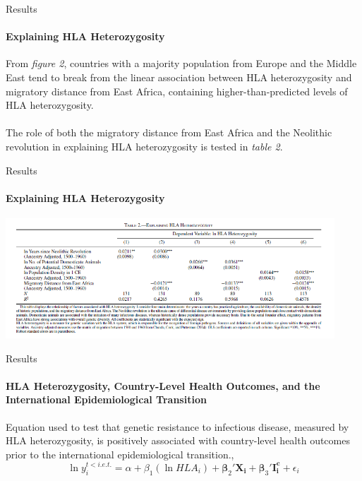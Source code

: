 \documentclass[pdftex,12pt,xcolor=pdftex,table]{beamer}
\theoremstyle{definition}
\theoremstyle{remark}
\numberwithin{equation}{section}
\numberwithin{figure}{section}
\begin{document}
\begin{frame}{Results}
\framesubtitle{Explaining HLA Heterozygosity}
\justifying
From \textit{figure 2}, countries with a majority population from Europe and the Middle East tend to break from the linear association between HLA heterozygosity and migratory distance from East Africa, containing higher-than-predicted levels of HLA heterozygosity.\\~\\
The role of both the migratory distance from East Africa and the Neolithic revolution in explaining HLA heterozygosity is tested in \textit{table 2}.
\end{frame}

\begin{frame}{Results}
\framesubtitle{Explaining HLA Heterozygosity}
\justifying
\includegraphics[height=4.5cm]{Table_2.PNG}
\end{frame}


\begin{frame}{Results}
\framesubtitle{HLA Heterozygosity, Country-Level Health Outcomes, and the International Epidemiological Transition}
\justifying
Equation used to test that genetic resistance to infectious disease, measured by HLA heterozygosity, is positively associated with country-level health outcomes prior to the international epidemiological transition.,
\pause
\begin{equation}
    \ln y_{i}^{t<i.e.t.}=\alpha+\beta_{1}(\ln HLA_{i})+\boldsymbol{\beta}_{2}'\mathbf{X_{i}}+\boldsymbol{\beta}_{3}'\mathbf{I_{i}^{c}}+\epsilon_{i}
\end{equation}

\end{frame}
\end{document}
